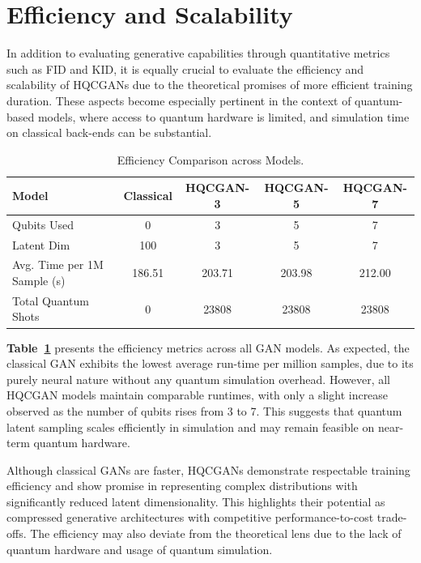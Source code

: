 \section{Efficiency and Scalability}

In addition to evaluating generative capabilities through quantitative metrics such as FID and KID, it is equally crucial to evaluate the efficiency and scalability of HQCGANs due to the theoretical promises of more efficient training duration. These aspects become especially pertinent in the context of quantum-based models, where access to quantum hardware is limited, and simulation time on classical back-ends can be substantial.

\begin{table}[h]
  \centering
  \begin{tabular}{|l|c|c|c|c|}
    \hline
    Model & Classical & HQCGAN-3 & HQCGAN-5 & HQCGAN-7 \\ \hline
    Qubits Used & 0 & 3 & 5 & 7 \\ \hline
    Latent Dim & 100 & 3 & 5 & 7 \\ \hline
    Avg. Time per 1M Sample (s) & 186.51 & 203.71 & 203.98 & 212.00 \\ \hline
    Total Quantum Shots & 0 & 23808 & 23808 & 23808 \\ \hline
  \end{tabular}
  \caption{Efficiency Comparison across Models.}
  \label{tab:efficiency_comparison}
\end{table}
\newpage
\textbf{Table~\ref{tab:efficiency_comparison}} presents the efficiency metrics across all GAN models. As expected, the classical GAN exhibits the lowest average run-time per million samples, due to its purely neural nature without any quantum simulation overhead. However, all HQCGAN models maintain comparable runtimes, with only a slight increase observed as the number of qubits rises from 3 to 7. This suggests that quantum latent sampling scales efficiently in simulation and may remain feasible on near-term quantum hardware.

Although classical GANs are faster, HQCGANs demonstrate respectable training efficiency and show promise in representing complex distributions with significantly reduced latent dimensionality. This highlights their potential as compressed generative architectures with competitive performance-to-cost trade-offs. The efficiency may also deviate from the theoretical lens due to the lack of quantum hardware and usage of quantum simulation.

